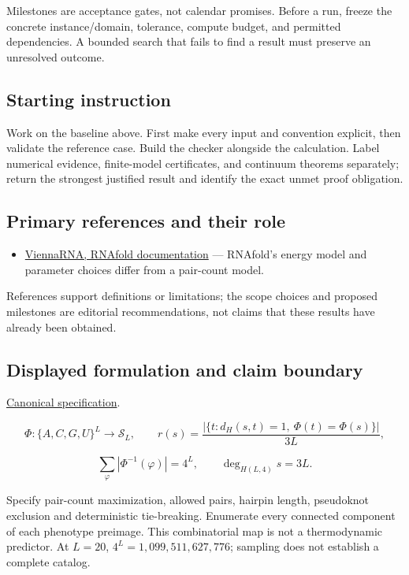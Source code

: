 \documentclass[
  11pt,
]{article}
\providecommand{\tightlist}{%
  \setlength{\itemsep}{0pt}\setlength{\parskip}{0pt}}
\begin{document}
Milestones are acceptance gates, not calendar promises. Before a run,
freeze the concrete instance/domain, tolerance, compute budget, and
permitted dependencies. A bounded search that fails to find a result
must preserve an unresolved outcome.

\subsection{Starting instruction}

Work on the baseline above. First make every input and convention
explicit, then validate the reference case. Build the checker alongside
the calculation. Label numerical evidence, finite-model certificates,
and continuum theorems separately; return the strongest justified result
and identify the exact unmet proof obligation.

\subsection{Primary references and their role}

\begin{itemize}
\tightlist
\item
  \href{https://www.tbi.univie.ac.at/RNA/RNAfold}{ViennaRNA, RNAfold
  documentation} --- RNAfold's energy model and parameter choices differ
  from a pair-count model.
\end{itemize}

References support definitions or limitations; the scope choices and
proposed milestones are editorial recommendations, not claims that these
results have already been obtained.

\subsection{Displayed formulation and claim boundary}

\href{https://github.com/rick-stevens-ai/Pure-Thought/blob/main/PRDs/30-Genotype-Phenotype-Mapping.md}{Canonical
specification}.

\[\Phi:\{A,C,G,U\}^L\longrightarrow\mathcal S_L,\qquad
r(s)=\frac{|\{t:d_H(s,t)=1,\ \Phi(t)=\Phi(s)\}|}{3L},\]

\[\sum_{\varphi}|\Phi^{-1}(\varphi)|=4^L,\qquad
\deg_{H(L,4)}s=3L.\]

Specify pair-count maximization, allowed pairs, hairpin length,
pseudoknot exclusion and deterministic tie-breaking. Enumerate every
connected component of each phenotype preimage. This combinatorial map
is not a thermodynamic predictor. At \(L=20\),
\(4^L=1{,}099{,}511{,}627{,}776\); sampling does not establish a
complete catalog.
\end{document}
